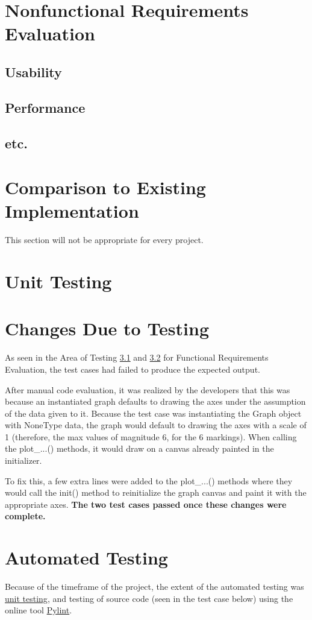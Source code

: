 \documentclass[12pt, titlepage]{article}
\begin{document}
\section{Nonfunctional Requirements Evaluation}
\subsection{Usability}
		
\subsection{Performance}
\subsection{etc.}
	
\section{Comparison to Existing Implementation}	
This section will not be appropriate for every project.
\section{Unit Testing}\label{sec:unittest}
\section{Changes Due to Testing}

As seen in the Area of Testing \hyperref[sec:3.1]{3.1} and \hyperref[sec:3.2]{3.2} for Functional Requirements Evaluation, the test cases had failed to produce the expected output. 

After manual code evaluation, it was realized by the developers that this was because an instantiated graph defaults to drawing the axes under the assumption of the data given to it. Because the test case was instantiating the Graph object with NoneType data, the graph would default to drawing the axes with a scale of 1 (therefore, the max values of magnitude 6, for the 6 markings). When calling the plot\_...() methods, it would draw on a canvas already painted in the initializer. 

To fix this, a few extra lines were added to the plot\_...() methods where they would call the init() method to reinitialize the graph canvas and paint it with the appropriate axes. 
\textbf{The two test cases passed once these changes were complete.}  
\section{Automated Testing}
Because of the timeframe of the project, the extent of the automated testing was \hyperref[sec:unittest]{unit testing}, and testing of source code (seen in the test case below) using the online tool \href{https://www.pylint.org}{Pylint}.
\end{document}
